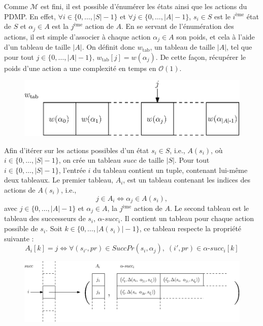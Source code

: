 \documentclass[12pt,a4paper]{report}
\theoremstyle{definition}%
\theoremstyle{remark}
\begin{document}
Comme $\mathcal{M}$ est fini, il est possible d'énumérer les états ainsi que
les actions du PDMP. En effet, $\forall i \in \{0, \dots, |S| - 1 \}$ et
$\forall j \in \{ 0, \dots, |A| - 1 \}$, $s_i \in S$ est le $i^\text{ème}$ état
de $S$ et $\alpha_j \in A$ est la $j^\text{ème}$ action de $A$.
En se servant de l'énumération des actions, il est simple d'associer à chaque
action $\alpha_j \in A$ son poids, et cela à l'aide d'un tableau de taille
$|A|$. On définit donc $w_{\text{tab}}$, un tableau de taille $|A|$, tel que
pour tout $j \in \{ 0, \dots, |A| - 1 \}$, $w_\text{tab}[j] = w(\alpha_j)$.
De cette façon, récupérer le poids d'une action a une complexité en temps
en $\mathcal{O}(1)$.
\begin{figure}[H]
	\centering
	\includegraphics[scale=0.85]{figures/wtab}
\end{figure}
Afin d'itérer sur les actions possibles d'un état
$s_i \in S$, i.e., $A(s_i)$, où $i \in \{0, \dots, |S| - 1 \}$, on crée un tableau $succ$ de
taille $|S|$. Pour tout $i \in \{0, \dots, |S| - 1 \}$, l'entrée $i$ du tableau
contient un tuple, contenant lui-même deux tableaux. Le premier tableau,
$A_i$, est
un tableau contenant les indices des actions de $A(s_i)$, i.e.,
\[j \in A_i \iff \alpha_j \in A(s_i),\] avec $j \in \{0, \dots, |A| - 1\}$ et
$\alpha_j \in A$, la $j^\text{ème}$ action de $A$. Le second tableau est le
tableau des successeurs de $s_i$, $\alpha\text{-}succ_i$.
Il contient un tableau pour chaque action possible de $s_i$.
Soit $k \in \{ 0, \dots, |A(s_i)| - 1 \}$, ce tableau respecte la propriété
suivante :
\[
	A_i[k] = j \iff
	\forall (s_{i'}, pr) \in SuccPr(s_i, \alpha_j), \; (i', pr) \in
	\alpha\text{-}succ_i[k]
\]

\begin{figure}[H]
	\captionsetup{justification=centering}
	\includegraphics[scale=0.83]{figures/alphasucctab}
\end{figure}
\end{document}
